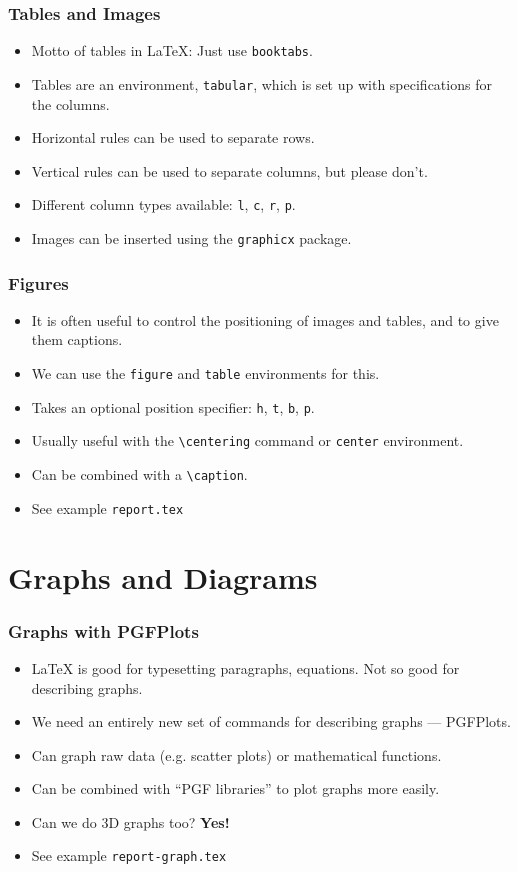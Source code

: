 \documentclass{beamer}
\begin{document}
\begin{frame}
	\frametitle{Tables and Images}
	\begin{itemize}
		\item Motto of tables in \LaTeX{}: Just use \texttt{booktabs}.
		\item Tables are an environment, \texttt{tabular}, which is set up with specifications for the columns.
		\item Horizontal rules can be used to separate rows.
		\item Vertical rules can be used to separate columns, but please don't.
		\item Different column types available: \texttt{l}, \texttt{c}, \texttt{r}, \texttt{p}.
		\item Images can be inserted using the \texttt{graphicx} package.
	\end{itemize}
\end{frame}

\begin{frame}
	\frametitle{Figures}
	\begin{itemize}
		\item It is often useful to control the positioning of images and tables, and to give them captions.
		\item We can use the \texttt{figure} and \texttt{table} environments for this.
		\item Takes an optional position specifier: \texttt{h}, \texttt{t}, \texttt{b}, \texttt{p}.
		\item Usually useful with the \texttt{\textbackslash{}centering} command or \texttt{center} environment.
		\item Can be combined with a \texttt{\textbackslash{}caption}.
		\item See example \texttt{report.tex}
	\end{itemize}
\end{frame}

\section{Graphs and Diagrams}

\begin{frame}
	\frametitle{Graphs with PGFPlots}
	\begin{itemize}
		\item \LaTeX{} is good for typesetting paragraphs, equations. Not so good for describing graphs.
		\item We need an entirely new set of commands for describing graphs --- PGFPlots.
		\item Can graph raw data (e.g. scatter plots) or mathematical functions.
		\item Can be combined with ``PGF libraries'' to plot graphs more easily.
		\item Can we do 3D graphs too? \textbf{Yes!}
		\item See example \texttt{report-graph.tex}
	\end{itemize}
\end{frame}
\end{document}

